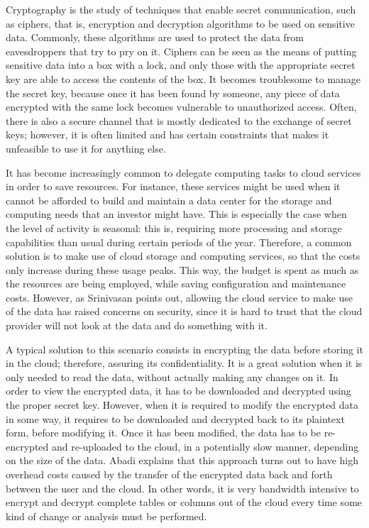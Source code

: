 Cryptography is the study of techniques that enable secret communication, such as ciphers, that is, encryption and decryption algorithms to be used on sensitive data. Commonly, these algorithms are used to protect the data from eavesdroppers that try to pry on it. Ciphers can be seen as the means of putting sensitive data into a box with a lock, and only those with the appropriate secret key are able to access the contents of the box. It becomes troublesome to manage the secret key, because once it has been found by someone, any piece of data encrypted with the same lock becomes vulnerable to unauthorized access. Often, there is also a secure channel that is mostly dedicated to the exchange of secret keys; however, it is often limited and has certain constraints that makes it unfeasible to use it for anything else.

It has become increasingly common to delegate computing tasks to cloud services in order to save resources. For instance, these services might be used when it cannot be afforded to build and maintain a data center for the storage and computing needs that an investor might have. This is especially the case when the level of activity is seasonal: this is, requiring more processing and storage capabilities than usual during certain periods of the year. Therefore, a common solution is to make use of cloud storage and computing services, so that the costs only increase during these usage peaks. This way, the budget is spent as much as the resources are being employed, while saving configuration and maintenance costs. However, as Srinivasan \cite{Srinivasan:2012:SCC:2345396.2345474} points out, allowing the cloud service to make use of the data has raised concerns on security, since it is hard to trust that the cloud provider will not look at the data and do something with it.

A typical solution to this scenario consists in encrypting the data before storing it in the cloud; therefore, assuring its confidentiality. It is a great solution when it is only needed to read the data, without actually making any changes on it. In order to view the encrypted data, it has to be downloaded and decrypted using the proper secret key. However, when it is required to modify the encrypted data in some way, it requires to be downloaded and decrypted back to its plaintext form, before modifying it. Once it has been modified, the data has to be re-encrypted and re-uploaded to the cloud, in a potentially slow manner, depending on the size of the data. Abadi \cite{abadi2009data} explains that this approach turns out to have high overhead costs caused by the transfer of the encrypted data back and forth between the user and the cloud. In other words, it is very bandwidth intensive to encrypt and decrypt complete tables or columns out of the cloud every time some kind of change or analysis must be performed.

